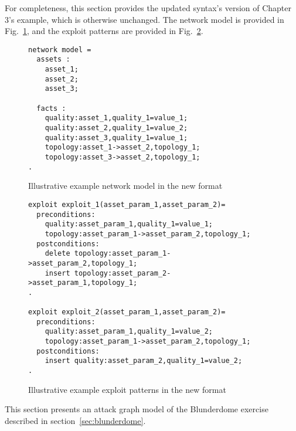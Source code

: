 For completeness, this section provides the updated syntax's version of
Chapter 3's example, which is otherwise unchanged. The network model is
provided in Fig.~\ref{fig:ill_updated_nm}, and the exploit patterns are
provided in Fig.~\ref{fig:ill_updated_xp}.

\begin{figure}
\begin{lstlisting}
network model = 
  assets :
    asset_1;
    asset_2;
    asset_3;

  facts :
    quality:asset_1,quality_1=value_1;
    quality:asset_2,quality_1=value_2;
    quality:asset_3,quality_1=value_1;
    topology:asset_1->asset_2,topology_1;
    topology:asset_3->asset_2,topology_1;
.
\end{lstlisting}
\caption{Illustrative example network model in the new format}
\label{fig:ill_updated_nm}
\end{figure}

\begin{figure}
\begin{lstlisting}
exploit exploit_1(asset_param_1,asset_param_2)=
  preconditions:
    quality:asset_param_1,quality_1=value_1;
    topology:asset_param_1->asset_param_2,topology_1;
  postconditions:
    delete topology:asset_param_1->asset_param_2,topology_1;
    insert topology:asset_param_2->asset_param_1,topology_1;
.

exploit exploit_2(asset_param_1,asset_param_2)=
  preconditions:
    quality:asset_param_1,quality_1=value_2;
    topology:asset_param_1->asset_param_2,topology_1;
  postconditions:
    insert quality:asset_param_2,quality_1=value_2;
.
\end{lstlisting}
\caption{Illustrative example exploit patterns in the new format}
\label{fig:ill_updated_xp}
\end{figure}

This section presents an attack graph model of the Blunderdome exercise
described in section~\ref{sec:blunderdome}.
